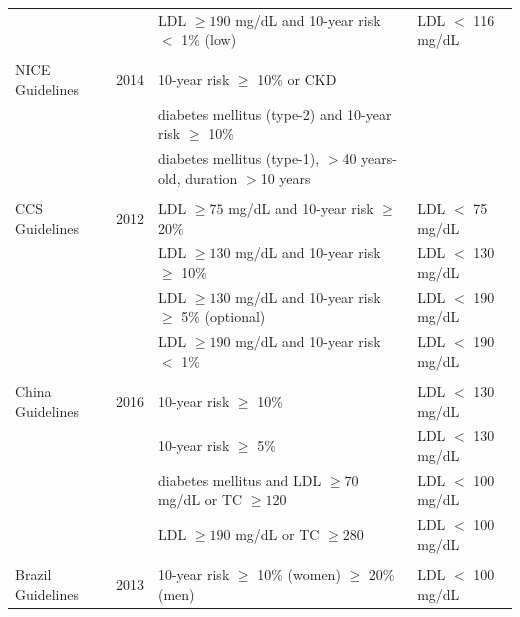 \documentclass[12pt]{article}
\begin{document}
\begin{appendix}
\begin{table}[H]
{\begin{threeparttable}
\begin{tabular}{llll}
            & & LDL $\geq 190$ mg/dL and 10-year risk\tnote{\textdagger} \hspace{1pt} $<$ 1\% (low) & LDL $<$ 116 mg/dL \\
            & & & \\
            NICE Guidelines \cite{rabar_lipid_2014} & 2014 & 10-year risk\tnote{\ddag} \hspace{1pt} $\geq$ 10\% or CKD &  \\
            & & diabetes mellitus (type-2) and 10-year risk\tnote{\ddag} \hspace{1pt} $\geq$ 10\% &  \\
            & & diabetes mellitus (type-1), $>$40 years-old, duration $>$10 years &  \\
            & & & \\
            CCS Guidelines \cite{anderson_2012_2013} & 2012 & LDL $\geq 75$ mg/dL and 10-year risk\tnote{\S} \hspace{1pt} $\geq$ 20\% & LDL $<$ 75 mg/dL \\
            & & LDL $\geq 130$ mg/dL and 10-year risk\tnote{\S} \hspace{1pt}  $\geq$ 10\% & LDL $<$ 130 mg/dL \\
            & & LDL $\geq 130$ mg/dL and 10-year risk\tnote{\S} \hspace{1pt}  $\geq$ 5\% (optional) & LDL $<$ 190 mg/dL \\
            & & LDL $\geq 190$ mg/dL and 10-year risk\tnote{\S} \hspace{1pt} $<$ 1\% & LDL $<$ 190 mg/dL \\
            & & & \\
            China Guidelines \cite{anderson_2012_2013} & 2016 & 10-year risk\tnote{$||$} \hspace{1pt} $\geq$ 10\% & LDL $<$ 130 mg/dL \\
            & & 10-year risk\tnote{$||$} \hspace{1pt} $\geq$ 5\% & LDL $<$ 130 mg/dL \\
            & & diabetes mellitus and LDL $\geq 70$ mg/dL or TC $\geq 120$ & LDL $<$ 100 mg/dL \\
            & & LDL $\geq 190$ mg/dL or TC $\geq 280$ & LDL $<$ 100 mg/dL \\
            & & & \\
            Brazil Guidelines \cite{anderson_2012_2013} & 2013 & 10-year risk\tnote{\S} \hspace{1pt} $\geq$ 10\% (women) $\geq$ 20\% (men) & LDL $<$ 100 mg/dL \\

\end{tabular}
\end{threeparttable}}
\end{table}
\end{appendix}
\end{document}
